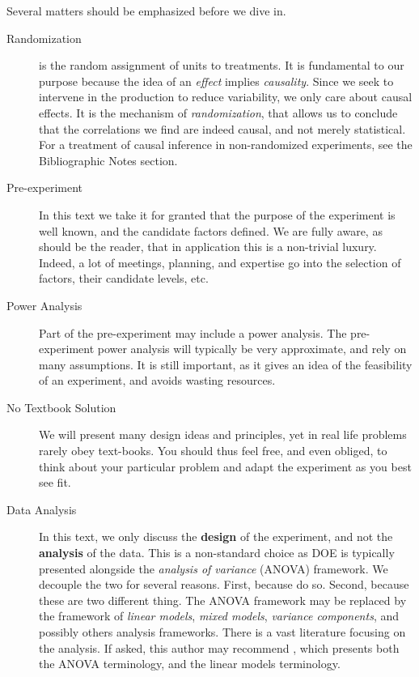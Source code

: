 Several matters should be emphasized before we dive in.
\begin{description}
	
	\item [Randomization] is the random assignment of units to treatments. 
	It is fundamental to our purpose because the idea of an \emph{effect} implies \emph{causality}. 
	Since we seek to intervene in the production to reduce variability, we only care about causal effects. 
	It is the mechanism of \emph{randomization}, that allows us to conclude that the correlations we find are indeed causal, and not merely statistical.
	For a treatment of causal inference in non-randomized experiments, see the Bibliographic Notes section.
	
	\item [Pre-experiment] In this text we take it for granted that the purpose of the experiment is well known, and the candidate factors defined. 
	We are fully aware, as should be the reader, that in application this is a non-trivial luxury. 
	Indeed, a lot of meetings, planning, and expertise go into the selection of factors, their candidate levels, etc.
	
	\item [Power Analysis] Part of the pre-experiment may include a power analysis. 
	The pre-experiment power analysis will typically be very approximate, and rely on many assumptions. 
	It is still important, as it gives an idea of the feasibility of an experiment, and avoids wasting resources.
	
	\item [No Textbook Solution] We will present many design ideas and principles, yet in real life problems rarely obey text-books.
	You should thus feel free, and even obliged, to think about your particular problem and adapt the experiment as you best see fit. 
	
	\item[Data Analysis]
	In this text, we only discuss the \textbf{design} of the experiment, and not the \textbf{analysis} of the data.
	This is a non-standard choice as DOE is typically presented alongside the \emph{analysis of variance} (ANOVA) framework. 
	We decouple the two for several reasons. 
	First, because \cite{cox_theory_2000} do so. 
	Second, because these are two different thing.
	The ANOVA framework may be replaced by the framework of \emph{linear models}, \emph{mixed models}, \emph{variance components}, and possibly others analysis frameworks. 
	There is a vast literature focusing on the analysis.
	If asked, this author may recommend \cite{hocking_analysis_1985}, which presents both the ANOVA terminology, and the linear models terminology.
	
\end{description}









